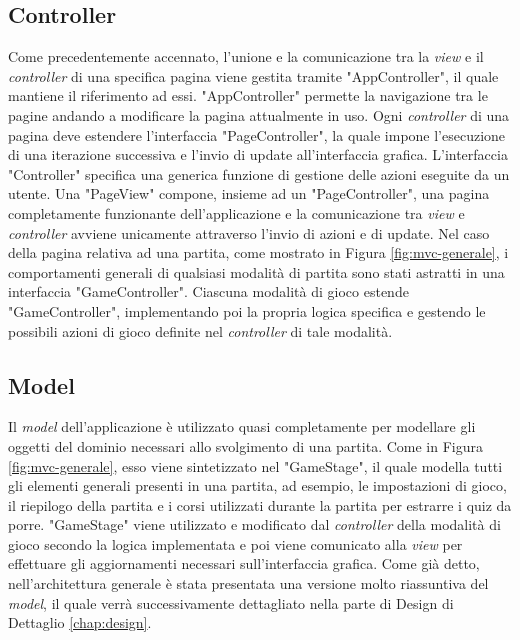     \subsection{Controller}\label{chap:generic-controller}
        Come precedentemente accennato, l'unione e la comunicazione tra la \textit{view} e il \textit{controller} di una specifica pagina viene gestita tramite "AppController", il quale mantiene il riferimento ad essi. "AppController" permette la navigazione tra le pagine andando a modificare la pagina attualmente in uso.
        Ogni \textit{controller} di una pagina deve estendere l'interfaccia "PageController", la quale impone l'esecuzione di una iterazione successiva e l'invio di update all'interfaccia grafica. L'interfaccia "Controller" specifica una generica funzione di gestione delle azioni eseguite da un utente.
        Una "PageView" compone, insieme ad un "PageController", una pagina completamente funzionante dell'applicazione e la comunicazione tra \textit{view} e \textit{controller} avviene unicamente attraverso l'invio di azioni e di update. Nel caso della pagina relativa ad una partita, come mostrato in Figura \ref{fig:mvc-generale}, i comportamenti generali di qualsiasi modalità di partita sono stati astratti in una interfaccia "GameController". Ciascuna modalità di gioco estende "GameController", implementando poi la propria logica specifica e gestendo le possibili azioni di gioco definite nel \textit{controller} di tale modalità.
 
    \subsection{Model}
        Il \textit{model} dell'applicazione è utilizzato quasi completamente per modellare gli oggetti del dominio necessari allo svolgimento di una partita.
        Come in Figura \ref{fig:mvc-generale}, esso viene sintetizzato nel "GameStage", il quale modella tutti gli elementi generali presenti in una partita, ad esempio, le impostazioni di gioco, il riepilogo della partita e i corsi utilizzati durante la partita per estrarre i quiz da porre. "GameStage" viene utilizzato e modificato dal \textit{controller} della modalità di gioco secondo la logica implementata e poi viene comunicato alla \textit{view} per effettuare gli aggiornamenti necessari sull'interfaccia grafica. Come già detto, nell'architettura generale è stata presentata una versione molto riassuntiva del \textit{model}, il quale verrà successivamente dettagliato nella parte di Design di Dettaglio \ref{chap:design}.